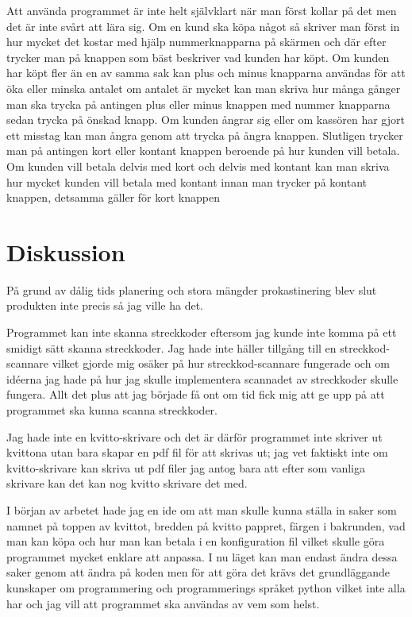 \documentclass[a4paper, 12pt]{article}
\begin{document}
Att använda programmet är inte helt självklart när man först kollar på det men det är inte svårt att lära sig.
Om en kund ska köpa något så skriver man först in hur mycket det kostar med hjälp nummerknapparna på skärmen och där efter trycker man på knappen som bäst beskriver vad kunden har köpt.
Om kunden har köpt fler än en av samma sak kan plus och minus knapparna användas för att öka eller minska antalet om antalet är mycket kan man skriva hur många gånger man ska trycka på antingen plus eller minus knappen med nummer knapparna sedan trycka på önskad knapp.
 Om kunden ångrar sig eller om kassören har gjort ett misstag kan man ångra genom att trycka på ångra knappen.
 Slutligen trycker man på antingen kort eller kontant knappen beroende på hur kunden vill betala. Om kunden vill betala delvis med kort och delvis med kontant kan man skriva hur mycket kunden vill betala med kontant innan man trycker på kontant knappen, detsamma gäller för kort knappen


\section{Diskussion}

På grund av dålig tids planering och stora mängder prokastinering blev slut produkten inte precis så jag ville ha det.


Programmet kan inte skanna streckkoder eftersom jag kunde inte komma på ett smidigt sätt skanna streckkoder. 
Jag hade inte häller tillgång till en streckkod-scannare vilket gjorde mig osäker på hur streckkod-scannare fungerade och om idéerna jag hade på hur jag skulle implementera scannadet av streckkoder skulle fungera. Allt det plus att jag började få ont om tid fick mig att ge upp på att programmet ska kunna scanna streckkoder.


Jag hade inte en kvitto-skrivare och det är därför programmet inte skriver ut kvittona utan bara skapar en pdf fil för att skrivas ut; jag vet faktiskt inte om kvitto-skrivare kan skriva ut pdf filer jag antog bara att efter som vanliga skrivare kan det kan nog kvitto skrivare det med.


I början av arbetet hade jag en ide om att man skulle kunna ställa in saker som namnet på toppen av kvittot, bredden på kvitto pappret, färgen i bakrunden, vad man kan köpa och hur man kan betala i en konfiguration fil vilket skulle göra programmet mycket enklare att anpassa. I nu läget kan man endast ändra dessa saker genom att ändra på koden men för att göra det krävs det grundläggande kunskaper om programmering och programmerings språket python vilket inte alla har och jag vill att programmet ska användas av vem som helst.
\end{document}
